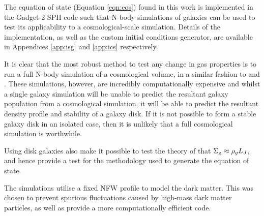 The equation of state (Equation \ref{eqn:eos}) found in this work is implemented in the Gadget-2 SPH code \citep{springel_cosmological_2005} such that N-body simulations of galaxies can be used to test its applicability to a cosmological-scale simulation.
Details of the implementation, as well as the custom initial conditions generator, are available in Appendices \ref{app:isg} and \ref{app:ics} respectively.

It is clear that the most robust method to test any change in gas properties is to run a full N-body simulation of a cosmological volume, in a similar fashion to \citet{vogelsberger_introducing_2014} and \citet{schaye_eagle_2015}.
These simulations, however, are incredibly computationally expensive and whilst a single galaxy simulation will be unable to predict the resultant galaxy population from a cosmological simulation, it will be able to predict the resultant density profile and stability of a galaxy disk.
If it is not possible to form a stable galaxy disk in an isolated case, then it is unlikely that a full cosmological simulation is worthwhile.

Using disk galaxies also make it possible to test the theory of \citet{schaye_model-independent_2001} that $\Sigma_\mathrm{g} \approx \rho_g L_J$, and hence provide a test for the methodology used to generate the equation of state.

The simulations utilise a fixed NFW profile \citep{navarro_structure_1996, coe_dark_2010} to model the dark matter.
This was chosen to prevent spurious fluctuations caused by high-mass dark matter particles, as well as provide a more computationally efficient code.
